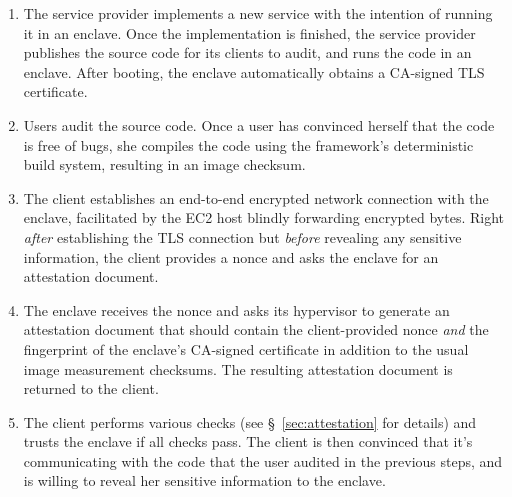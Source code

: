 \begin{enumerate}
    \item The service provider implements a new service with the intention of
      running it in an enclave.  Once the implementation is finished, the
      service provider publishes the source code for its clients to audit, and
      runs the code in an enclave.  After booting, the enclave automatically
      obtains a CA-signed TLS certificate.

    \item Users audit the source code.  Once a user has convinced herself that
      the code is free of bugs, she compiles the code using the framework's
      deterministic build system, resulting in an image checksum.

    \item The client establishes an end-to-end encrypted network connection with
      the enclave, facilitated by the EC2 host blindly forwarding encrypted
      bytes.  Right \emph{after} establishing the TLS connection but
      \emph{before} revealing any sensitive information, the client provides a
      nonce and asks the enclave for an attestation document.

    \item The enclave receives the nonce and asks its hypervisor to generate an
      attestation document that should contain the client-provided nonce
      \emph{and} the fingerprint of the enclave's CA-signed certificate in
      addition to the usual image measurement checksums.  The
      resulting attestation document is returned to the client.

    \item The client performs various checks (see \S~\ref{sec:attestation} for
      details) and trusts the enclave if all checks pass.  The client is then
      convinced that it's communicating with the code that the user audited in
      the previous steps, and is willing to reveal her sensitive information to
      the enclave.
\end{enumerate}


